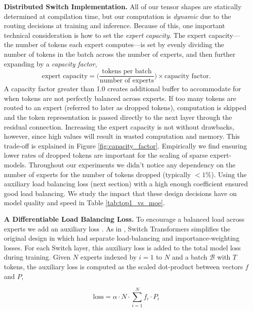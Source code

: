 \documentclass[twoside,11pt]{article}
\begin{document}
\textbf{Distributed Switch Implementation.}
All of our tensor shapes are statically determined at compilation time, but our computation is \emph{dynamic} due to the routing decisions at training and inference.
Because of this, one important technical consideration is how to set the \emph{expert capacity}.
The expert capacity---the number of tokens each expert computes---is set by evenly dividing the number of tokens in the batch across the number of experts, and then further expanding by a \emph{capacity factor},
\begin{equation}
\text{expert capacity} = \biggr(\frac{\text{tokens per batch}}{\text{number of experts}}\biggr) \times \text{capacity factor}.
\end{equation}
A capacity factor greater than 1.0 creates additional buffer to accommodate for when tokens are not perfectly balanced across experts.
If too many tokens are routed to an expert (referred to later as dropped tokens), computation is skipped and the token representation is passed directly to the next layer through the residual connection.
Increasing the expert capacity is not without drawbacks, however, since high values will result in wasted computation and memory.
This trade-off is explained in Figure \ref{fig:capacity_factor}.
Empirically we find ensuring lower rates of dropped tokens are important for the scaling of sparse expert-models. Throughout our experiments we didn't notice any dependency on the number of experts for the number of tokens dropped (typically $<1\%$). Using the auxiliary load balancing loss (next section) with a high enough coefficient ensured good load balancing.
We study the impact that these design decisions have on model quality and speed  in Table \ref{tab:top1_vs_moe}.

\textbf{A Differentiable Load Balancing Loss.}
To encourage a balanced load across experts we add an auxiliary loss \citep{shazeer2017outrageously,shazeer2018mesh,lepikhin2020gshard}.
As in \cite{shazeer2018mesh,lepikhin2020gshard}, Switch Transformers simplifies the original design in \cite{shazeer2017outrageously} which had separate load-balancing and importance-weighting losses.
For each Switch layer, this auxiliary loss is added to the total model loss during training. 
Given $N$ experts indexed by $i=1$ to $N$ and a batch $\mathcal{B}$ with $T$ tokens, the auxiliary loss is computed as the scaled dot-product between vectors $f$ and $P$,

\begin{equation}  \label{eq:total_loss}
\text{loss} = \alpha \cdot N \cdot \sum_{i=1}^{N} f_i \cdot P_i
\end{equation}
\end{document}
